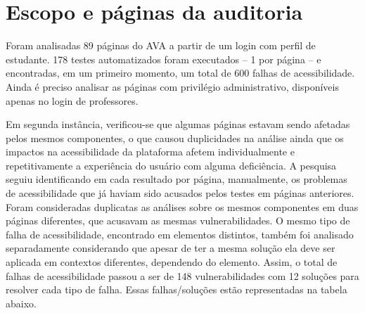 \documentclass[
	12pt,				%
	openright,			%
	oneside,			%
	a4paper,			%
	chapter=TITLE,		%
	section=TITLE,		%
	subsection=TITLE,	%
	subsubsection=TITLE,%
	english,			%
	brazil				%
	]{abntex2}
\theoremstyle{definition}
\begin{document}
\section{Escopo e páginas da auditoria}

Foram analisadas 89 páginas do AVA a partir de um login com perfil de estudante. 178 testes automatizados foram executados – 1 por página – e encontradas, em um primeiro momento, um total de 600 falhas de acessibilidade. Ainda é preciso analisar as páginas com privilégio administrativo, disponíveis apenas no login de professores.

Em segunda instância, verificou-se que algumas páginas estavam sendo afetadas pelos mesmos componentes, o que causou duplicidades na análise ainda que os impactos na acessibilidade da plataforma afetem individualmente e repetitivamente a experiência do usuário com alguma deficiência. A pesquisa seguiu identificando em cada resultado por página, manualmente, os problemas de acessibilidade que já haviam sido acusados pelos testes em páginas anteriores. Foram consideradas duplicatas as análises sobre os mesmos componentes em duas páginas diferentes, que acusavam as mesmas vulnerabilidades. O mesmo tipo de falha de acessibilidade, encontrado em elementos distintos, também foi analisado separadamente considerando que apesar de ter a mesma solução ela deve ser aplicada em contextos diferentes, dependendo do elemento. Assim, o total de falhas de acessibilidade passou a ser de 148 vulnerabilidades com 12 soluções para resolver cada tipo de falha. Essas falhas/soluções estão representadas na tabela abaixo.
\end{document}
